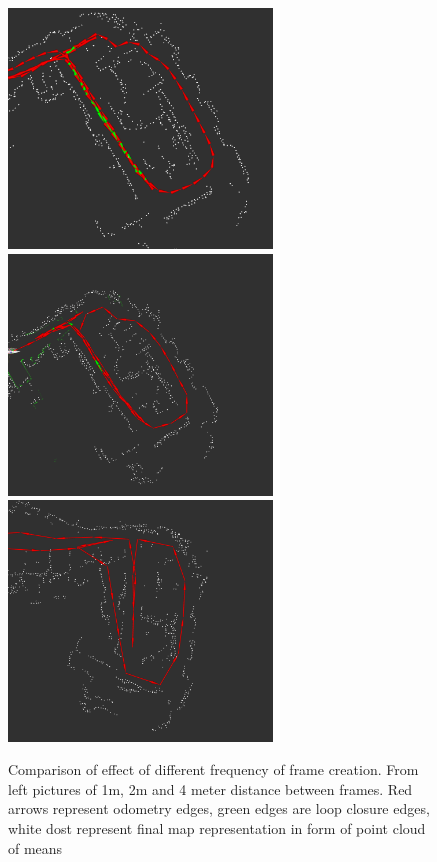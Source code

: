 \begin{figure}
	\centering
	\includegraphics[width=70mm]{../img/gen_len1.png}
		\vspace{0.1cm}
	\includegraphics[width=70mm]{../img/gen_len2.png}
	\includegraphics[width=70mm]{../img/gen_len4.png}
	\caption{Comparison of effect of different frequency of frame creation. From left pictures of 1m, 2m and 4 meter distance between frames. Red arrows represent odometry edges, green edges are loop closure edges, white dost represent final map representation in form of point cloud of means}\label{fig:frame_freq}
\end{figure}
\newpage
